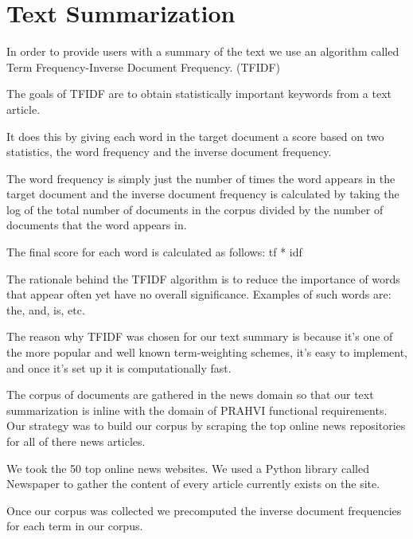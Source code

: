 \section{Text Summarization}
In order to provide users with a summary of the text we use an algorithm called Term Frequency-Inverse Document Frequency. (TFIDF)

The goals of TFIDF are to obtain statistically important keywords from a text article. 

It does this by giving each word in the target document a score based on two statistics, the word frequency and the inverse document frequency.

The word frequency is simply just the number of times the word appears in the target document and the inverse document frequency is calculated by taking the log of the total number of documents in the corpus divided by the number of documents that the word appears in.

The final score for each word is calculated as follows: tf * idf

The rationale behind the TFIDF algorithm is to reduce the importance of words that appear often yet have no overall significance. Examples of such words are: the, and, is, etc.

The reason why TFIDF was chosen for our text summary is because it's one of the more popular and well known term-weighting schemes, it's easy to implement, and once it's set up it is computationally fast.

The corpus of documents are gathered in the news domain so that our text summarization is inline with the domain of PRAHVI functional requirements. Our strategy was to build our corpus by scraping the top online news repositories for all of there news articles. 

We took the 50 top online news websites. We used a Python library called Newspaper to gather the content of every article currently exists on the site.

Once our corpus was collected we precomputed the inverse document frequencies for each term in our corpus.
